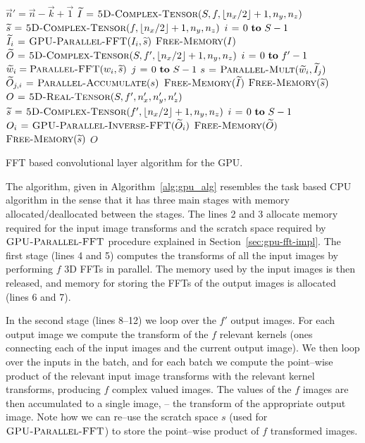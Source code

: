 \documentclass[conference]{./IEEEtran/IEEEtran}
\DeclarePairedDelimiter{\floor}{\lfloor}{\rfloor}
\begin{document}
  \begin{algorithm}
    {\footnotesize
    \begin{codebox}
      \li $\vec{n}' = \vec{n} - \vec{k} + \vec{1}$
      \li $\widetilde{I} \gets \proc{5D-Complex-Tensor}(S,f,\floor{n_x/2}+1,n_y,n_z)$
      \li $\widetilde{s} \gets \proc{5D-Complex-Tensor}(f,\floor{n_x/2}+1,n_y,n_z)$
      \li \For $i \gets 0 \To S-1$
      \li   \Do $\widetilde{I}_{i} \mathrel{\hspace{1pt}=\hspace{1pt}} \textnormal{\scshape GPU-Parallel-FFT}(I_{i},\widetilde{s})$
      \End
      \li $\textnormal{\scshape Free-Memory}(I)$
      \li $\widetilde{O} \gets \proc{5D-Complex-Tensor}(S,f',\floor{n_x/2}+1,n_y,n_z)$
      \li \For $i \gets 0 \To f'-1$
      \li    \Do $\widetilde{w}_{i} = \textnormal{\scshape Parallel-FFT}(w_{i},\widetilde{s})$
      \li        \For $j \gets 0 \To S-1$
      \li           \Do $s \mathrel{\hspace{1pt}=\hspace{1pt}} \textnormal{\scshape Parallel-Mult}(\widetilde{w}_{i}, \widetilde{I}_{j})$
      \li               $\widetilde{O}_{j,i} \mathrel{\hspace{1pt}=\hspace{1pt}} \textnormal{\scshape Parallel-Accumulate}(s)$
      \End \End
      \li $\textnormal{\scshape Free-Memory}(\widetilde{I})$
      \li $\textnormal{\scshape Free-Memory}(\widetilde{s})$
      \li $O \mathrel{\hspace{1pt}=\hspace{1pt}} \textnormal{\scshape5D-Real-Tensor}(S,f',n'_x,n'_y,n'_z)$
      \li $\widetilde{s} \gets \proc{5D-Complex-Tensor}(f',\floor{n_x/2}+1,n_y,n_z)$
      \li \For $i \gets 0 \To S-1$
      \li   \Do $O_{i} \mathrel{\hspace{1pt}=\hspace{1pt}} \textnormal{\scshape GPU-Parallel-Inverse-FFT}(\widetilde{O}_{i})$
      \End
      \li $\textnormal{\scshape Free-Memory}(\widetilde{O})$
      \li $\textnormal{\scshape Free-Memory}(\widetilde{s})$
      \li \Return $O$
    \end{codebox}
    }

    \caption{FFT based convolutional layer algorithm for the GPU.}
    \label{alg:gpu_alg}
  \end{algorithm}

  The algorithm, given in Algorithm~\ref{alg:gpu_alg} resembles the
  task based CPU algorithm in the sense that it has three main stages
  with memory allocated/deallocated between the stages.  The lines 2
  and 3 allocate memory required for the input image transforms and
  the scratch space required by $\textnormal{\scshape GPU-Parallel-FFT}$ procedure
  explained in Section~\ref{sec:gpu-fft-impl}.  The first stage (lines
  4 and 5) computes the transforms of all the input images by
  performing $f$ 3D FFTs in parallel.  The memory used by the input
  images is then released, and memory for storing the FFTs of the
  output images is allocated (lines 6 and 7).

  In the second stage (lines 8--12) we loop over the $f'$ output
  images.  For each output image we compute the transform
  of the $f$ relevant kernels (ones connecting each of the input
  images and the current output image).  We then loop
  over the inputs in the batch, and for each batch we compute the
  point--wise product of the relevant input image transforms with the
  relevant kernel transforms, producing $f$ complex valued images.
  The values of the $f$ images are then accumulated to a single image,
  -- the transform of the appropriate output image.  Note how we can
  re--use the scratch space $s$ (used for $\textnormal{\scshape GPU-Parallel-FFT}$)
  to store the point--wise product of $f$ transformed images.
\end{document}
